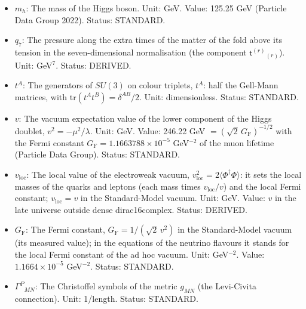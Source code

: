 \documentclass[
  10pt,
]{article}
\begin{document}
\begin{itemize}
  \(m_d, m_s, m_b\)), of the charged leptons (\(m_e, m_\mu, m_\tau\))
  and of the three neutrino mass states (\(m_1, m_2, m_3\), Dirac
  masses). Unit: GeV. Value: measured values;
  \(\Delta m_{21}^2 = 7.41\times10^{-5}\) eV\(^2\),
  \(\lvert\Delta m_{31}^2\rvert = 2.511\times10^{-3}\) eV\(^2\) in the
  computations of UM-4 (the global fit NuFIT 5.2 of the oscillation
  data, November 2022), \(7.49\times10^{-5}\) and \(2.513\times10^{-3}\)
  eV\(^2\) in NuFIT 6.0 (2024); the lightest mass \(m_1 = 0\) in the
  computations, below 23 meV by DESI DR2 with the CMB and NuFIT 6.0.
  Status: STANDARD.
\item
  \(m_h\): The mass of the Higgs boson. Unit: GeV. Value: 125.25 GeV
  (Particle Data Group 2022). Status: STANDARD.
\item
  \(q_7\): The pressure along the extra times of the matter of the fold
  above its tension in the seven-dimensional normalisation (the
  component \(\mathsf{t}^{(r)}{}_{(r)}\)). Unit: GeV\(^7\). Status:
  DERIVED.
\item
  \(t^A\): The generators of \(SU(3)\) on colour triplets, \(t^A\): half
  the Gell-Mann matrices, with \(\mathrm{tr}(t^At^B) = \delta^{AB}/2\).
  Unit: dimensionless. Status: STANDARD.
\item
  \(v\): The vacuum expectation value of the lower component of the
  Higgs doublet, \(v^2 = -\mu^2/\lambda\). Unit: GeV. Value: 246.22 GeV
  \(= (\sqrt2\,G_{\mathrm{F}})^{-1/2}\) with the Fermi constant
  \(G_{\mathrm{F}} = 1.1663788\times10^{-5}\) GeV\(^{-2}\) of the muon
  lifetime (Particle Data Group). Status: STANDARD.
\item
  \(v_{\mathrm{loc}}\): The local value of the electroweak vacuum,
  \(v_{\mathrm{loc}}^2 = 2\langle\Phi^\dagger\Phi\rangle\): it sets the
  local masses of the quarks and leptons (each mass times
  \(v_{\mathrm{loc}}/v\)) and the local Fermi constant;
  \(v_{\mathrm{loc}} = v\) in the Standard-Model vacuum. Unit: GeV.
  Value: \(v\) in the late universe outside dense dirac16complex.
  Status: DERIVED.
\item
  \(G_{\mathrm{F}}\): The Fermi constant,
  \(G_{\mathrm{F}} = 1/(\sqrt2\,v^2)\) in the Standard-Model vacuum (its
  measured value); in the equations of the neutrino flavours it stands
  for the local Fermi constant of the ad hoc vacuum. Unit: GeV\(^{-2}\).
  Value: \(1.1664\times10^{-5}\) GeV\(^{-2}\). Status: STANDARD.
\item
  \(\Gamma^P{}_{MN}\): The Christoffel symbols of the metric \(g_{MN}\)
  (the Levi-Civita connection). Unit: 1/length. Status: STANDARD.

\end{itemize}
\end{document}
